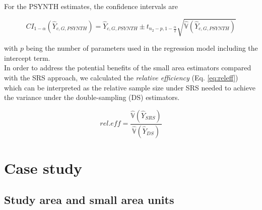 \documentclass[remotesensing,article,submit,moreauthors,pdftex,10pt,a4paper]{mdpi}
\newcommand{\psynth}{PSYNTH}
\newcommand{\var}{\mathbb{V}}
\begin{document}
For the \psynth{} estimates, the confidence intervals are


\begin{equation}\label{ci_2phase_psynth}
CI_{1-\alpha}(\hat{Y}_{c,G,PSYNTH})=\hat{Y}_{c,G,PSYNTH} \pm t_{n_{2}-p, 1-\frac{\alpha}{2}}\sqrt{\hat{\var}(\hat{Y}_{c,G,PSYNTH})}
\end{equation}

\noindent with $p$ being the number of parameters used in the regression model including the intercept term.\\

In order to address the potential benefits of the small area estimators compared with the SRS approach, we calculated the \textit{relative efficiency} (Eq. \ref{eq:releff}) which can be interpreted as the relative sample size under SRS needed to achieve the variance under the double-sampling (DS) estimators.

\begin{equation}\label{eq:releff}
rel.eff=\frac{\hat{\var}(\hat{Y}_{SRS})}{\hat{\var}(\hat{Y}_{DS})}
\end{equation}

\section{Case study}
\label{sec:CaseStudy}


\subsection{Study area and small area units}
\label{sec:studyarea}
\end{document}
